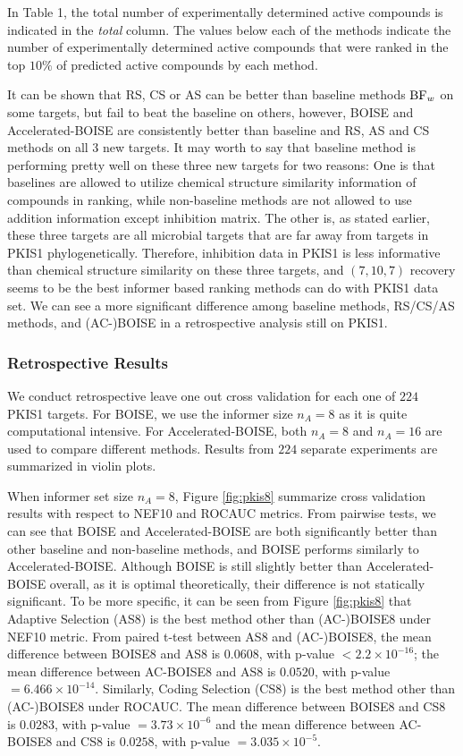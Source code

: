 \documentclass[12pt]{article}
\begin{document}
In Table 1, the total number of experimentally determined active compounds is indicated in the \textit{total} column. The values below each of the methods indicate the number of experimentally determined active compounds that were ranked in the top $10\%$ of predicted active compounds by each method. 

It can be shown that RS, CS or AS can be better than baseline methods ${\rm BF}_w$ on some targets, but fail to beat the baseline on others, however, BOISE and Accelerated-BOISE are consistently better than baseline and RS, AS and CS methods on all 3 new targets. It may worth to say that baseline method is performing pretty well on these three new targets for two reasons: One is that baselines are allowed to utilize chemical structure similarity information of compounds in ranking, while non-baseline methods are not allowed to use addition information except inhibition matrix. The other is, as stated earlier, these three targets are all microbial targets that are far away from targets in PKIS1 phylogenetically. Therefore, inhibition data in PKIS1 is less informative than chemical structure similarity on these three targets, and $(7,10,7)$ recovery seems to be the best informer based ranking methods can do with PKIS1 data set. We can see a more significant difference among baseline methods, RS/CS/AS methods, and (AC-)BOISE in a retrospective analysis still on PKIS1.

\subsubsection{Retrospective Results}
We conduct retrospective leave one out cross validation for each one of $224$ PKIS1 targets. For BOISE, we use the informer size $n_A = 8$ as it is quite computational intensive. For Accelerated-BOISE, both $n_A= 8$ and $n_A = 16$ are used to compare different methods. Results from $224$ separate experiments are summarized in violin plots. 

When informer set size $n_A = 8$, Figure \ref{fig:pkis8} summarize cross validation results with respect to NEF10 and ROCAUC metrics. From pairwise tests, we can see that BOISE and Accelerated-BOISE are both significantly better than other baseline and non-baseline methods, and BOISE performs similarly to Accelerated-BOISE. Although BOISE is still slightly better than Accelerated-BOISE overall, as it is optimal theoretically, their difference is not statically significant. 
To be more specific, it can be seen from Figure \ref{fig:pkis8} that Adaptive Selection (AS8) is the best method other than (AC-)BOISE8 under NEF10 metric. From paired t-test between AS8 and (AC-)BOISE8, the mean difference between BOISE8 and AS8 is $0.0608$, with p-value $<2.2\times 10^{-16}$; the mean difference between AC-BOISE8 and AS8 is $0.0520$, with p-value $=6.466\times 10^{-14}$. Similarly, Coding Selection (CS8) is the best method other than (AC-)BOISE8 under ROCAUC. The mean difference between BOISE8 and CS8 is $0.0283$, with p-value $=3.73\times 10^{-6}$ and the mean difference between AC-BOISE8 and CS8 is $0.0258$, with p-value $=3.035\times 10^{-5}$.
\end{document}
